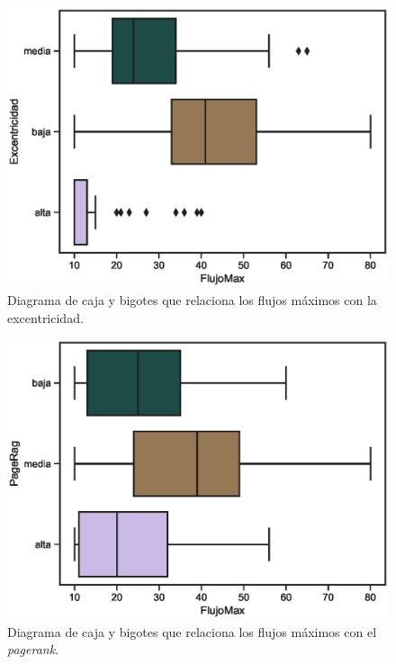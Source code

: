 \documentclass{article}
\begin{document}
\begin{center}
\begin{figure}[htbp]
\includegraphics[scale=0.6]{boxplot_FlujoMaxExcentricidad.eps}
\caption{Diagrama de caja y bigotes que relaciona los flujos máximos con la excentricidad.}
\label{fig23}
\end{figure}
\end{center}

\begin{center}
\begin{figure}[htbp]
\includegraphics[scale=0.6]{boxplot_FlujoMaxPageRag.eps}
\caption{Diagrama de caja y bigotes que relaciona los flujos máximos con el  \textit{pagerank}.}
\label{fig24}
\end{figure}
\end{center}
 
\end{document}
